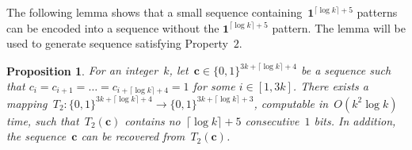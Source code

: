 \documentclass[10pt,a4paper,onecolumn]{IEEEtran}
\newtheorem{proposition}{Proposition}
\newcommand{\1}{\mathbbold{1}}
\newcommand{\boldc}{\mathbf{c}}
\begin{document}
The following lemma shows that a small sequence containing~$\boldsymbol{1}^{\lceil \log k \rceil +5}$ patterns can be encoded into a sequence without the $\boldsymbol{1}^{\lceil \log k \rceil +5}$ pattern. The lemma will be used to generate sequence satisfying Property~$2$.
\begin{proposition}\label{lemma:3kto3kminus1}
For an integer~$k$,
let~$\boldc\in\{0,1\}^{3k+\lceil \log k\rceil+4}$ be a sequence %
such that $c_i=c_{i+1}=\ldots=c_{i+\lceil \log k \rceil +4}=1$ for some $i\in [1,3k]$.
There exists a mapping~$T_2:\{0,1\}^{3k+\lceil \log k\rceil+4}\rightarrow \{0,1\}^{3k+\lceil \log k\rceil+3}$, computable in~$O(k^2\log k)$ time, such that~$T_2(\boldc)$ contains no~$\lceil \log k \rceil +5$ consecutive~$1$ bits. In addition, the sequence~$\boldc$ can be recovered from~$T_2(\boldc)$.
\end{proposition}
\end{document}
